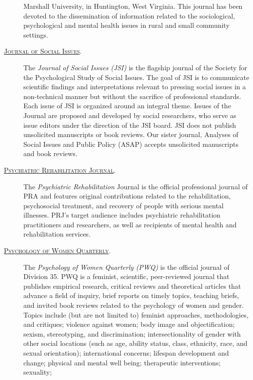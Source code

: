 \documentclass[]{tufte-handout}
\begin{document}
\begin{description}
Marshall University, in Huntington, West Virginia. This journal has been
devoted to the dissemination of information related to the sociological,
psychological and mental health issues in rural and small community
settings.
\item[\href{https://www.spssi.org/index.cfm?fuseaction=page.viewpage\&pageid=950}{\textsc{Journal of Social Issues}}.]
The \emph{Journal of Social Issues (JSI)} is the flagship journal of the
Society for the Psychological Study of Social Issues. The goal of JSI is
to communicate scientific findings and interpretations relevant to
pressing social issues in a non-technical manner but without the
sacrifice of professional standards. Each issue of JSI is organized
around an integral theme. Issues of the Journal are proposed and
developed by social researchers, who serve as issue editors under the
direction of the JSI board. JSI does not publish unsolicited manuscripts
or book reviews. Our sister journal, Analyses of Social Issues and
Public Policy (ASAP) accepts unsolicited manuscripts and book reviews.
\item[\href{http://www.uspra.org/knowledge-center/psychiatric-rehabilitation-journal}{\textsc{Psychiatric Rehabilitation Journal}}.]
The \emph{Psychiatric Rehabilitation} Journal is the official
professional journal of PRA and features original contributions related
to the rehabilitation, psychosocial treatment, and recovery of people
with serious mental illnesses. PRJ's target audience includes
psychiatric rehabilitation practitioners and researchers, as well as
recipients of mental health and rehabilitation services.
\item[\href{http://www.apadivisions.org/division-35/publications/journal/index.aspx}{\textsc{Psychology of Women Quarterly}}.]
The \emph{Psychology of Women Quarterly (PWQ)} is the official journal
of Division 35. PWQ is a feminist, scientific, peer-reviewed journal
that publishes empirical research, critical reviews and theoretical
articles that advance a field of inquiry, brief reports on timely
topics, teaching briefs, and invited book reviews related to the
psychology of women and gender. Topics include (but are not limited to)
feminist approaches, methodologies, and critiques; violence against
women; body image and objectification; sexism, stereotyping, and
discrimination; intersectionality of gender with other social locations
(such as age, ability status, class, ethnicity, race, and sexual
orientation); international concerns; lifespan development and change;
physical and mental well being; therapeutic interventions; sexuality;

\end{description}
\end{document}
